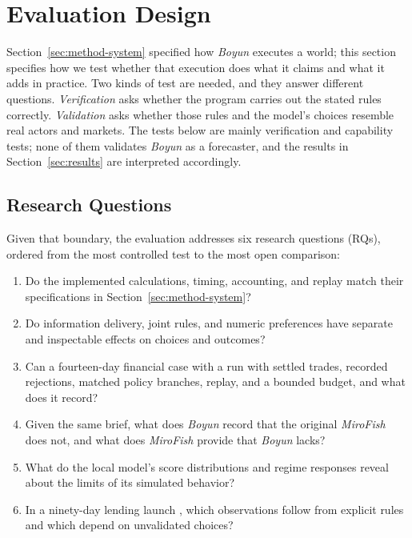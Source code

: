 \section{Evaluation Design}\label{sec:evaluation}
Section~\ref{sec:method-system} specified how \textit{Boyun} executes a world;
this section specifies how we test whether that execution does what it claims
and what it adds in practice. Two kinds of test are needed, and they answer
different questions. \textit{Verification} asks whether the program carries
out the stated rules correctly. \textit{Validation} asks whether those rules
and the model's choices resemble real actors and markets. The tests
below are mainly verification and capability tests; none of them validates
\textit{Boyun} as a forecaster, and the results in Section~\ref{sec:results}
are interpreted accordingly.

\subsection{Research Questions}
Given that boundary, the evaluation addresses six research questions (RQs),
ordered from the most controlled test to the most open comparison:
\begin{enumerate}\setlength{\itemsep}{1pt}
\item[\textit{RQ1}] Do the implemented calculations, timing, accounting, and
replay match their specifications in Section~\ref{sec:method-system}?
\item[\textit{RQ2}] Do  information delivery, joint rules, and numeric
preferences have separate and inspectable effects on  choices and outcomes?
\item[\textit{RQ3}] Can a fourteen-day financial case with a  run
with settled trades,  recorded rejections, matched policy branches, replay,
and a bounded budget, and what does it record?
\item[\textit{RQ4}] Given the same brief, what does \textit{Boyun} record that
the original \textit{MiroFish} does not, and what does \textit{MiroFish}
provide that \textit{Boyun} lacks?
\item[\textit{RQ5}] What do the local model's score distributions and
regime responses reveal about the limits of its simulated  behavior?
\item[\textit{RQ6}] In a ninety-day lending launch , which observations follow
from explicit rules and which depend on unvalidated  choices?
\end{enumerate}

